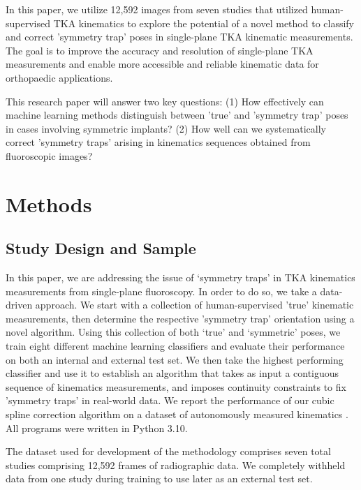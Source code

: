 In this paper, we utilize 12,592 images from seven studies that utilized human-supervised TKA kinematics \cite{jennyREGISTRATIONKNEEKINEMATICS2015,kefalaAssessmentKneeKinematics2017,okamotoVivoKneeKinematics2011,palm-vlasakMinimalVariationTop2022,scottCanTotalKnee2016,watanabeKneeKinematicsAnterior2013,watanabeInvivoKinematicsHighflex2016} to explore the potential of a novel method to classify and correct 'symmetry trap' poses in single-plane TKA kinematic measurements.
The goal is to improve the accuracy and resolution of single-plane TKA measurements and enable more accessible and reliable kinematic data for orthopaedic applications.

This research paper will answer two key questions:  (1) How effectively can machine learning methods distinguish between 'true' and 'symmetry trap' poses in cases involving symmetric implants? (2) How well can we systematically correct 'symmetry traps' arising in kinematics sequences obtained from fluoroscopic images?

\section{Methods}
\subsection{Study Design and Sample}
In this paper, we are addressing the issue of ‘symmetry traps’ in TKA kinematics measurements from single-plane fluoroscopy.
In order to do so, we take a data-driven approach.
We start with a collection of human-supervised 'true' kinematic measurements, then determine the respective 'symmetry trap' orientation using a novel algorithm.
Using this collection of both ‘true’ and ‘symmetric’ poses, we train eight different machine learning classifiers and evaluate their performance on both an internal and external test set. We then take the highest performing classifier and use it to establish an algorithm that takes as input a contiguous sequence of kinematics measurements, and imposes continuity constraints to fix 'symmetry traps' in real-world data.
We report the performance of our cubic spline correction algorithm on a dataset of autonomously measured kinematics \cite{jensenJointTrackMachine2023}.
All programs were written in Python 3.10.

The dataset used for development of the methodology comprises seven total studies \cite{jennyREGISTRATIONKNEEKINEMATICS2015,kefalaAssessmentKneeKinematics2017,okamotoVivoKneeKinematics2011,palm-vlasakMinimalVariationTop2022,scottCanTotalKnee2016,watanabeKneeKinematicsAnterior2013,watanabeInvivoKinematicsHighflex2016} comprising 12,592 frames of radiographic data.
We completely withheld data from one study \cite{okamotoVivoKneeKinematics2011} during training to use later as an external test set.

